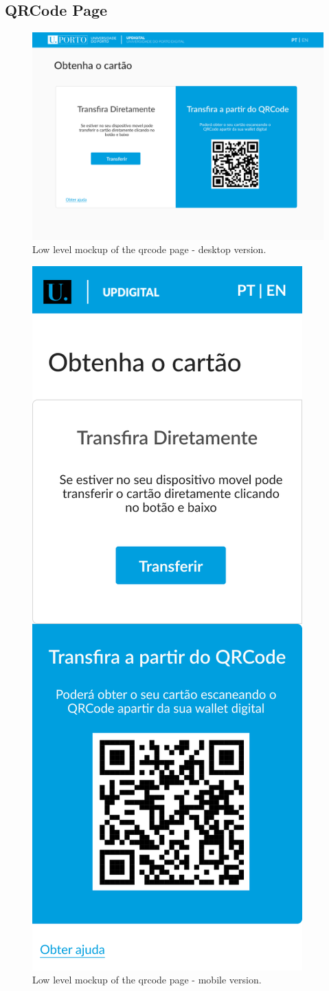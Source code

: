 \documentclass[10pt]{article}
\begin{document}
\clearpage

\subsection{QRCode Page}

\begin{figure}[H]
  \centering
  \includegraphics[width=1\linewidth]{report-images/qrcode-page-desktop.png}
  \caption{Low level mockup of the qrcode page - desktop version.}
  \label{fig:fig-11}
\end{figure}

\begin{figure}[H]
  \centering
  \includegraphics[width=0.25\linewidth]{report-images/qrcode-page-mobile.png}
  \caption{Low level mockup of the qrcode page - mobile version.}
  \label{fig:fig-12}
\end{figure}
\end{document}

